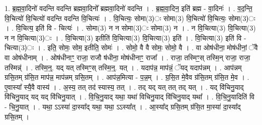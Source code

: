 \documentclass[17pt]{extarticle}
\begin{document}
1. ब्र॒ह्म॒वा॒दिनो॑ वदन्ति वदन्ति ब्रह्मवा॒दिनो᳚ ब्रह्मवा॒दिनो॑ वदन्ति । . ब्र॒ह्म॒वा॒दिन॒ इति॑ ब्रह्म - वा॒दिनः॑ । . व॒द॒न्ति॒ वि॒चित्यो॑ वि॒चित्यो॑ वदन्ति वदन्ति वि॒चित्यः॑ । . वि॒चित्यः॒ सोमा(3)ः सोमा(3) वि॒चित्यो॑ वि॒चित्यः॒ सोमा(3)ः । . वि॒चित्य॒ इति॑ वि - चित्यः॑ । . सोमा(3) न न सोमा(3)ः सोमा(3) न । . न वि॒चित्या(3) वि॒चित्या(3) न न वि॒चित्या(3)ः । . वि॒चित्या(3) इतीति॑ वि॒चित्या(3) वि॒चित्या(3) इति॑ । . वि॒चित्या(3) इति॑ वि - चित्या(3)ः । . इति॒ सोमः॒ सोम॒ इतीति॒ सोमः॑ । . सोमो॒ वै वै सोमः॒ सोमो॒ वै । . वा ओष॑धीना॒ मोष॑धीनां॒ ॅवै वा ओष॑धीनाम् । . ओष॑धीनाꣳ॒॒ राजा॒ राजौ ष॑धीना॒ मोष॑धीनाꣳ॒॒ राजा᳚ । . राजा॒ तस्मिꣳ॒॒स् तस्मि॒न् राजा॒ राजा॒ तस्मिन्न्॑ । . तस्मि॒न्॒. यद् यत् तस्मिꣳ॒॒स् तस्मि॒न्॒. यत् । . यदाप॑न्न॒ माप॑न्नं॒ ॅयद् यदाप॑न्नम् । . आप॑न्नम् ग्रसि॒तम् ग्र॑सि॒त माप॑न्न॒ माप॑न्नम् ग्रसि॒तम् । . आप॑न्न॒मित्या - प॒न्न॒म् । . ग्र॒सि॒त मे॒वैव ग्र॑सि॒तम् ग्र॑सि॒त मे॒व । . ए॒वास्या᳚ स्यै॒वै वास्य॑ । . अ॒स्य॒ तत् तद॑ स्यास्य॒ तत् । . तद् यद् यत् तत् तद् यत् । . यद् वि॑चिनु॒याद् वि॑चिनु॒याद् यद् यद् वि॑चिनु॒यात् । . वि॒चि॒नु॒याद् यथा॒ यथा॑ विचिनु॒याद् वि॑चिनु॒याद् यथा᳚ । . वि॒चि॒नु॒यादिति॑ वि - चि॒नु॒यात् । . यथा॒ ऽऽस्या॑ दा॒स्या᳚द् यथा॒ यथा॒ ऽऽस्या᳚त् । . आ॒स्या᳚द् ग्रसि॒तम् ग्र॑सि॒त मा॒स्या॑ दा॒स्या᳚द् ग्रसि॒तम् । \newline
\end{document}

